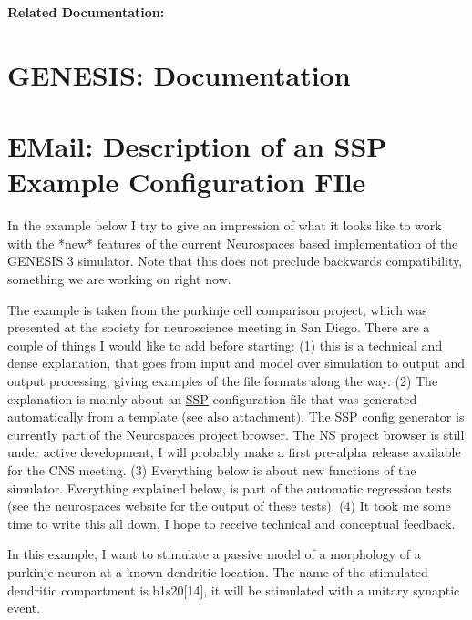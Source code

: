 \documentclass[12pt]{article}
\begin{document}
{\bf Related Documentation:}

\section*{GENESIS: Documentation}

\section{EMail: Description of an SSP Example Configuration FIle}

In the example below I try to give an impression of what it looks like
to work with the *new* features of the current Neurospaces based
implementation of the GENESIS 3 simulator.  Note that this does not
preclude backwards compatibility, something we are working on right
now.

The example is taken from the purkinje cell comparison project, which
was presented at the society for neuroscience meeting in San Diego.
There are a couple of things I would like to add before starting: (1)
this is a technical and dense explanation, that goes from input and
model over simulation to output and output processing, giving examples
of the file formats along the way.  (2) The explanation is mainly
about an \href{../ssp/ssp.tex}{SSP} configuration file that was
generated automatically from a template (see also attachment).  The
SSP config generator is currently part of the Neurospaces project
browser.  The NS project browser is still under active development, I
will probably make a first pre-alpha release available for the CNS
meeting.  (3) Everything below is about new functions of the
simulator.  Everything explained below, is part of the automatic
regression tests (see the neurospaces website for the output of these
tests).  (4) It took me some time to write this all down, I hope to
receive technical and conceptual feedback.

In this example, I want to stimulate a passive model of a morphology
of a purkinje neuron at a known dendritic location.  The name of the
stimulated dendritic compartment is b1s20[14], it will be stimulated
with a unitary synaptic event.
\end{document}
